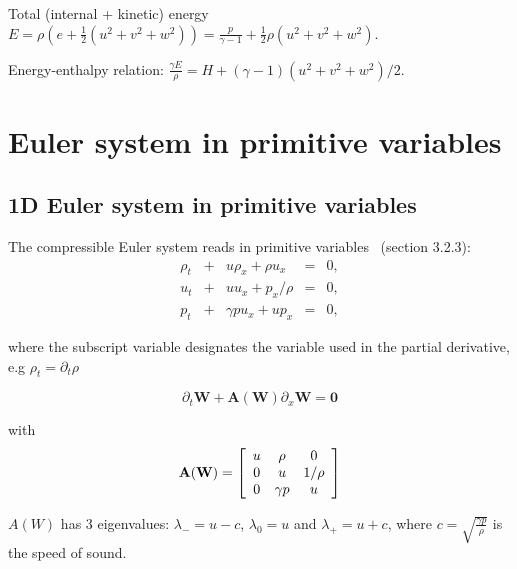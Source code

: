 \documentclass{article}
\begin{document}
Total (internal + kinetic) energy $E = \rho \left( e + \frac{1}{2} (u^2+v^2+w^2) \right) = \frac{p}{\gamma-1} + \frac{1}{2} \rho (u^2+v^2+w^2)$.

Energy-enthalpy relation: $\frac{\gamma E}{\rho}=H+(\gamma-1)(u^2+v^2+w^2)/2$.

\section{Euler system in primitive variables}

\subsection*{1D Euler system in primitive variables}
The compressible Euler system reads in primitive variables~\cite{toro} (section 3.2.3):\\

\begin{equation}
  \begin{array}{ccccc}
    \rho_t & + & u\rho_x + \rho u_x   & = & 0,\\
    u_t    & + & u u_x   + p_x/\rho   & = & 0,\\
    p_t    & + & \gamma p u_x + u p_x & = & 0,
  \end{array}
\end{equation}

where the subscript variable designates the variable used in the partial derivative, e.g $\rho_t = \partial_t \rho$

\begin{equation}
  \partial_t \mathbf{W} + \mathbf{A(W)} \partial_x \mathbf{W} = \mathbf{0}
\end{equation}

with
\begin{equation}
  \mathbf{A(W)} = \left[
    \begin{array}{c c c c}
      u & \rho     & 0 \\
      0 & u        & 1/\rho\\
      0 & \gamma p & u \\
    \end{array}
  \right]
\end{equation}

$A(W)$ has 3 eigenvalues: $\lambda_{-}=u-c$, $\lambda_{0}=u$ and $\lambda_{+}=u+c$, where $c=\sqrt{\frac{\gamma p}{\rho}}$ is the speed of sound.
\end{document}

